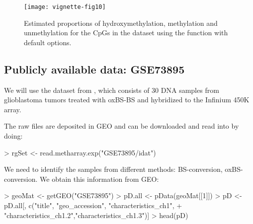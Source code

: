 \documentclass{article}
\begin{document}
\begin{figure*}[h]
 \texttt{[image: vignette-fig10]}
 \caption{\label{fig:fig10} Estimated proportions of hydroxymethylation, methylation and unmethylation for the CpGs in the dataset using the  function with default options.}
\end{figure*}

\subsection{Publicly available data: GSE73895}

We will use the dataset from \cite{pmid27886174}, which consists of 30 DNA samples from glioblastoma tumors treated with oxBS-BS and hybridized to the Infinium 450K array.


The raw files are deposited in GEO and can be downloaded and read into \R{} by doing:
\begin{Schunk}
\end{Schunk}

\begin{Schunk}
\begin{Sinput}
> rgSet <- read.metharray.exp("GSE73895/idat")
\end{Sinput}
\end{Schunk}

We need to identify the samples from different methods: BS-conversion, oxBS-conversion. We obtain this information from GEO:

\begin{Schunk}
\begin{Sinput}
> geoMat <- getGEO("GSE73895")
> pD.all <- pData(geoMat[[1]])
> pD <- pD.all[, c("title", "geo_accession", "characteristics_ch1",
+                  "characteristics_ch1.2","characteristics_ch1.3")]
> head(pD)
\end{Sinput}
\end{Schunk}
\end{document}
